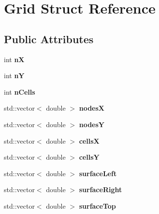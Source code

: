 \hypertarget{struct_grid}{}\section{Grid Struct Reference}
\label{struct_grid}
\subsection*{Public Attributes}
\begin{DoxyCompactItemize}
\item 
\mbox{\label{struct_grid_a1ab9d46b423e63f1ec47fc336a9102e8}} 
int {\bfseries nX}
\item 
\mbox{\label{struct_grid_a756b23e85df153a3ce2d273ad5a9349e}} 
int {\bfseries nY}
\item 
\mbox{\label{struct_grid_a097095819b5bd14e9593b16ed80835bb}} 
int {\bfseries n\+Cells}
\item 
\mbox{\label{struct_grid_ac0c29952fdd96883f7971d9d894091e1}} 
std\+::vector$<$ double $>$ {\bfseries nodesX}
\item 
\mbox{\label{struct_grid_a436a80f31aa90cb1ad57d7121dafac1d}} 
std\+::vector$<$ double $>$ {\bfseries nodesY}
\item 
\mbox{\label{struct_grid_abc5f5da7b7b7a4acfdb370f36d448d0e}} 
std\+::vector$<$ double $>$ {\bfseries cellsX}
\item 
\mbox{\label{struct_grid_afdd79ac0105ade43fbe874860b48b041}} 
std\+::vector$<$ double $>$ {\bfseries cellsY}
\item 
\mbox{\label{struct_grid_a30d28fd4e36cf6b4adefa6db0520bcd6}} 
std\+::vector$<$ double $>$ {\bfseries surface\+Left}
\item 
\mbox{\label{struct_grid_af011d9e30a1fb4d70815c7b93de09d47}} 
std\+::vector$<$ double $>$ {\bfseries surface\+Right}
\item 
\mbox{\label{struct_grid_a26a8916104b13aa188532378b1acf7c4}} 
std\+::vector$<$ double $>$ {\bfseries surface\+Top}

\end{DoxyCompactItemize}
